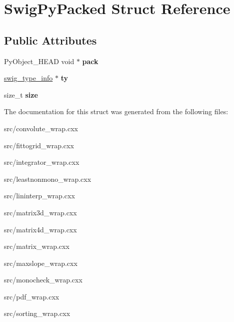 \hypertarget{structSwigPyPacked}{
\section{SwigPyPacked Struct Reference}
\label{db/d08/structSwigPyPacked}
}
\subsection*{Public Attributes}
\begin{DoxyCompactItemize}
\item 
\hypertarget{structSwigPyPacked_a90bf060d4d9b7924acc8bc81525244d4}{
PyObject\_\-HEAD void $\ast$ {\bfseries pack}}
\label{db/d08/structSwigPyPacked_a90bf060d4d9b7924acc8bc81525244d4}

\item 
\hypertarget{structSwigPyPacked_ae179dcfa49ddb42652601334198d4271}{
\hyperlink{structswig__type__info}{swig\_\-type\_\-info} $\ast$ {\bfseries ty}}
\label{db/d08/structSwigPyPacked_ae179dcfa49ddb42652601334198d4271}

\item 
\hypertarget{structSwigPyPacked_aed2bfb8fb3c9f804c386215db63921cb}{
size\_\-t {\bfseries size}}
\label{db/d08/structSwigPyPacked_aed2bfb8fb3c9f804c386215db63921cb}

\end{DoxyCompactItemize}


The documentation for this struct was generated from the following files:\begin{DoxyCompactItemize}
\item 
src/convolute\_\-wrap.cxx\item 
src/fittogrid\_\-wrap.cxx\item 
src/integrator\_\-wrap.cxx\item 
src/leastnonmono\_\-wrap.cxx\item 
src/lininterp\_\-wrap.cxx\item 
src/matrix3d\_\-wrap.cxx\item 
src/matrix4d\_\-wrap.cxx\item 
src/matrix\_\-wrap.cxx\item 
src/maxslope\_\-wrap.cxx\item 
src/monocheck\_\-wrap.cxx\item 
src/pdf\_\-wrap.cxx\item 
src/sorting\_\-wrap.cxx\end{DoxyCompactItemize}
